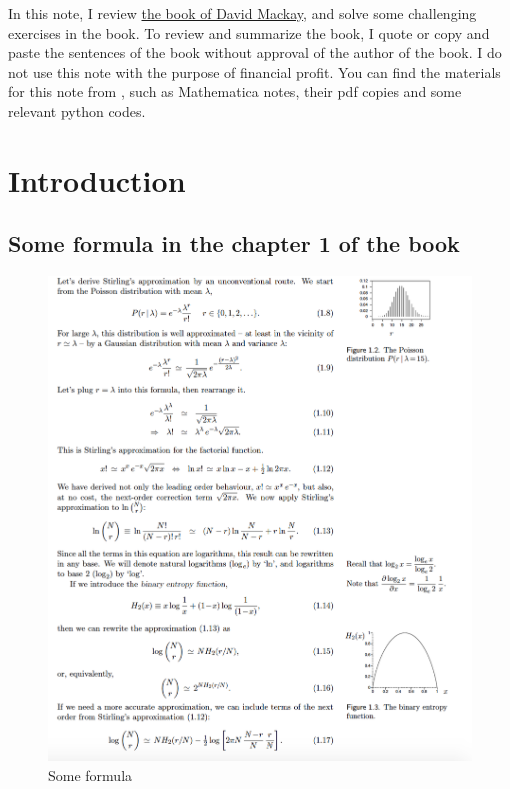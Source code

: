 \documentclass[a4paper,11pt]{article}
\newcommand{\vect}[1]{\boldsymbol{\mathbf{#1}}}
\numberwithin{equation}{section}
\begin{document}
 

In this note, I review \href{http://www.inference.phy.cam.ac.uk/mackay/itila/}{the book of David Mackay}, and solve some challenging exercises in the book. To review and summarize the book, I quote or copy and paste the sentences of the book without approval of the author of the book. I do not use this note with the purpose of financial profit. You can find the materials for this note from \href{https://github.com/physhik/Study-of-David-Mackay-s-book-}{\vect{my github}}, such as Mathematica notes, their pdf copies and some relevant python codes. 

\section{Introduction}
\subsection{Some formula in the chapter 1 of the book}
\begin{figure}[h!]
\centerline{\includegraphics[scale=0.6]{probability_formulae.png}}
\caption{Some formula}
\end{figure}
\end{document}
